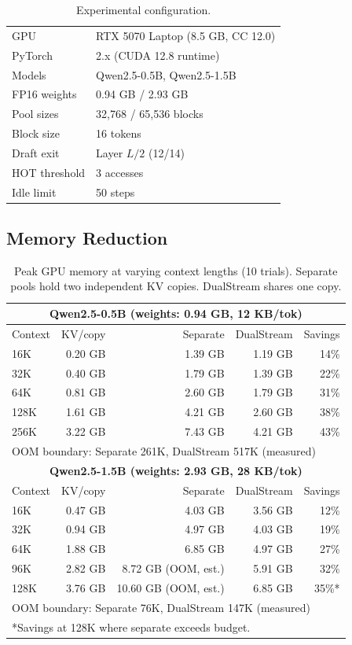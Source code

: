 \documentclass[review]{elsarticle}
\theoremstyle{definition}
\theoremstyle{remark}
\begin{document}
\begin{table}[t]
\centering
\caption{Experimental configuration.}
\label{tab:setup}
\begin{tabular}{ll}
\toprule
GPU & RTX 5070 Laptop (8.5 GB, CC 12.0) \\
PyTorch & 2.x (CUDA 12.8 runtime) \\
Models & Qwen2.5-0.5B, Qwen2.5-1.5B \\
FP16 weights & 0.94 GB / 2.93 GB \\
Pool sizes & 32,768 / 65,536 blocks \\
Block size & 16 tokens \\
Draft exit & Layer $L/2$ (12/14) \\
HOT threshold & 3 accesses \\
Idle limit & 50 steps \\
\bottomrule
\end{tabular}
\end{table}

\subsection{Memory Reduction}
\label{sec:eval-memory}

\begin{table}[t]
\centering
\caption{Peak GPU memory at varying context lengths (10 trials). Separate
pools hold two independent KV copies. DualStream shares one copy.}
\label{tab:memory}
\begin{tabular}{lrrrr}
\toprule
\multicolumn{5}{c}{\textbf{Qwen2.5-0.5B (weights: 0.94 GB, 12 KB/tok)}} \\
\midrule
Context & KV/copy & Separate & DualStream & Savings \\
\midrule
16K  & 0.20 GB & 1.39 GB & 1.19 GB & 14\% \\
32K  & 0.40 GB & 1.79 GB & 1.39 GB & 22\% \\
64K  & 0.81 GB & 2.60 GB & 1.79 GB & 31\% \\
128K & 1.61 GB & 4.21 GB & 2.60 GB & 38\% \\
256K & 3.22 GB & 7.43 GB & 4.21 GB & 43\% \\
\midrule
\multicolumn{5}{l}{OOM boundary: Separate 261K, DualStream 517K (measured)} \\
\midrule
\multicolumn{5}{c}{\textbf{Qwen2.5-1.5B (weights: 2.93 GB, 28 KB/tok)}} \\
\midrule
Context & KV/copy & Separate & DualStream & Savings \\
\midrule
16K  & 0.47 GB & 4.03 GB & 3.56 GB & 12\% \\
32K  & 0.94 GB & 4.97 GB & 4.03 GB & 19\% \\
64K  & 1.88 GB & 6.85 GB & 4.97 GB & 27\% \\
96K  & 2.82 GB & 8.72 GB (OOM, est.) & 5.91 GB & 32\% \\
128K & 3.76 GB & 10.60 GB (OOM, est.) & 6.85 GB & 35\%* \\
\bottomrule
\multicolumn{5}{l}{OOM boundary: Separate 76K, DualStream 147K (measured)} \\
\multicolumn{5}{l}{*Savings at 128K where separate exceeds budget.}
\end{tabular}
\end{table}
\end{document}
